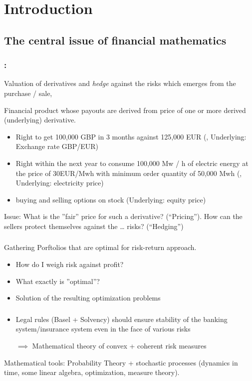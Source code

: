 \chapter{Introduction}
\section{The central issue of financial mathematics}
\subsection*{:}
Valuation of derivatives and \emph{hedge} against the risks which emerges from the purchase / sale,

\begin{*definition}
	Financial product whose payouts are derived from price of one or more  derived (underlying) derivative.
\end{*definition}
\begin{*example}
	\begin{itemize}
		\item Right to get 100,000 GBP in 3 months against 125,000 EUR (, Underlying: Exchange rate GBP/EUR)
		\item Right within the next year to consume 100,000 Mw / h of electric energy at the price of 30EUR/Mwh with minimum order quantity of 50,000 Mwh (, Underlying: electricity price)
		\item buying and selling options on stock (Underlying: equity price)
	\end{itemize}
\end{*example}
Issue:  What is the ''fair'' price for such a derivative? (``Pricing''). How can the sellers protect themselves against the … risks? (``Hedging'')

\subsection*{}
Gathering Porftolios that are optimal for risk-return approach.
\begin{itemize}
	\item How do I weigh risk against profit?
	\item What exactly is ''optimal''?
	\item Solution of the resulting optimization problems
\end{itemize}
\subsection*{}
\begin{itemize}
	
	\item Legal rules (Basel + Solvency) should ensure stability of the banking system/insurance system even in the face of various risks 
	
	$\implies$ Mathematical theory of convex + coherent risk measures 
\end{itemize}	 
Mathematical tools: Probability Theory + stochastic processes (dynamics in time, some linear algebra, optimization, measure theory).


